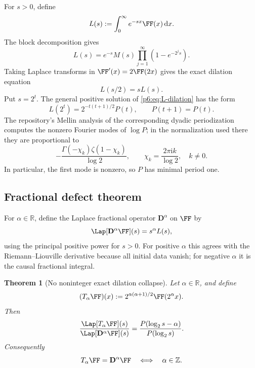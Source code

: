 \documentclass[11pt,oneside]{article}
\newtheorem{theorem}{Theorem}[section]
\theoremstyle{definition}
\theoremstyle{remark}
\newcommand{\R}{\mathbb R}
\newcommand{\dd}{\,\mathrm d}
\newcommand{\ii}{\mathrm i}
\newcommand{\1}{\mathbf 1}
\begin{document}
For \(s>0\), define
\begin{equation}
 L(s):=\int_0^\infty e^{-sx}\FF(x)\dd x.                  \label{p6:eq:global-L}
\end{equation}
The block decomposition gives
\begin{equation}
 L(s)=e^{-s}M(s)\prod_{j=1}^{\infty}(1-e^{-2^js}).        \label{p6:eq:global-L-product}
\end{equation}
Taking Laplace transforms in \(\FF'(x)=2\FF(2x)\) gives the exact dilation equation
\begin{equation}
 L(s/2)=sL(s).                                             \label{p6:eq:L-dilation}
\end{equation}
Put \(s=2^t\).  The general positive solution of \eqref{p6:eq:L-dilation} has the form
\begin{equation}
 L(2^t)=2^{-t(t+1)/2}P(t),\qquad P(t+1)=P(t).             \label{p6:eq:L-periodic}
\end{equation}
The repository's Mellin analysis of the corresponding dyadic periodization computes the
nonzero Fourier modes of \(\log P\); in the normalization used there they are proportional
to
\begin{equation}
 -\frac{\Gamma(-\chi_k)\zeta(1-\chi_k)}{\log2},\qquad
 \chi_k=\frac{2\pi\ii k}{\log2},\quad k\ne0.             \label{p6:eq:P-Fourier}
\end{equation}
In particular, the first mode is nonzero, so \(P\) has minimal period one.

\subsection{Fractional defect theorem}

For \(\alpha\in\R\), define the Laplace fractional operator
\(\mathbf D^\alpha\) on \(\FF\) by
\begin{equation}
 \Lap[\mathbf D^\alpha\FF](s)=s^\alpha L(s),              \label{p6:eq:fractional-Laplace-def}
\end{equation}
using the principal positive power for \(s>0\).  For positive \(\alpha\) this agrees
with the Riemann--Liouville derivative because all initial data vanish; for negative
\(\alpha\) it is the causal fractional integral.

\begin{theorem}[No noninteger exact dilation collapse]
\label{p6:thm:fractional-obstruction}
Let \(\alpha\in\R\), and define
\begin{equation}
 (T_\alpha\FF)(x):=2^{\alpha(\alpha+1)/2}\FF(2^\alpha x). \label{p6:eq:Talpha}
\end{equation}
Then
\begin{equation}
 \frac{\Lap[T_\alpha\FF](s)}{\Lap[\mathbf D^\alpha\FF](s)}
 =\frac{P(\log_2s-\alpha)}{P(\log_2s)}.                  \label{p6:eq:fractional-defect}
\end{equation}
Consequently
\begin{equation}
 T_\alpha\FF=\mathbf D^\alpha\FF
 \quad\Longleftrightarrow\quad\alpha\in\mathbb Z.       \label{p6:eq:fractional-iff-integer}
\end{equation}
\end{theorem}
\end{document}
